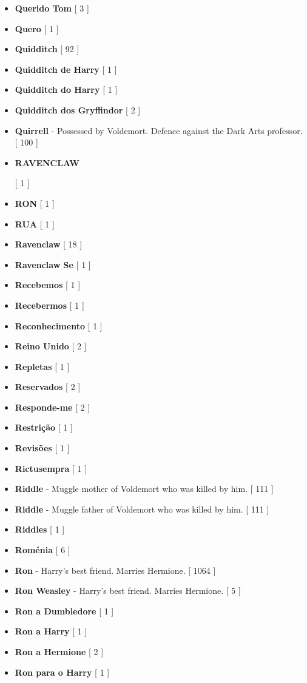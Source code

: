 \documentclass[a4paper]{article}
\begin{document}
{\begin{itemize}
	\item \textbf{Querido Tom} [ 3 ]
	\item \textbf{Quero} [ 1 ]
	\item \textbf{Quidditch} [ 92 ]
	\item \textbf{Quidditch de Harry} [ 1 ]
	\item \textbf{Quidditch do Harry} [ 1 ]
	\item \textbf{Quidditch dos Gryffindor} [ 2 ]
	\item \textbf{Quirrell} - Possessed by Voldemort. Defence against the Dark Arts professor. [ 100 ]
	\item \hypertarget{R}{\textbf{RAVENCLAW}} [ 1 ]
	\item \textbf{RON} [ 1 ]
	\item \textbf{RUA} [ 1 ]
	\item \textbf{Ravenclaw} [ 18 ]
	\item \textbf{Ravenclaw Se} [ 1 ]
	\item \textbf{Recebemos} [ 1 ]
	\item \textbf{Recebermos} [ 1 ]
	\item \textbf{Reconhecimento} [ 1 ]
	\item \textbf{Reino Unido} [ 2 ]
	\item \textbf{Repletas} [ 1 ]
	\item \textbf{Reservados} [ 2 ]
	\item \textbf{Responde-me} [ 2 ]
	\item \textbf{Restrição} [ 1 ]
	\item \textbf{Revisões} [ 1 ]
	\item \textbf{Rictusempra} [ 1 ]
	\item \textbf{Riddle} - Muggle mother of Voldemort who was killed by him. [ 111 ]
	\item \textbf{Riddle} - Muggle father of Voldemort who was killed by him. [ 111 ]
	\item \textbf{Riddles} [ 1 ]
	\item \textbf{Roménia} [ 6 ]
	\item \textbf{Ron} - Harry's best friend. Marries Hermione. [ 1064 ]
	\item \textbf{Ron Weasley} - Harry's best friend. Marries Hermione. [ 5 ]
	\item \textbf{Ron a Dumbledore} [ 1 ]
	\item \textbf{Ron a Harry} [ 1 ]
	\item \textbf{Ron a Hermione} [ 2 ]
	\item \textbf{Ron para o Harry} [ 1 ]

\end{itemize}}
\end{document}
